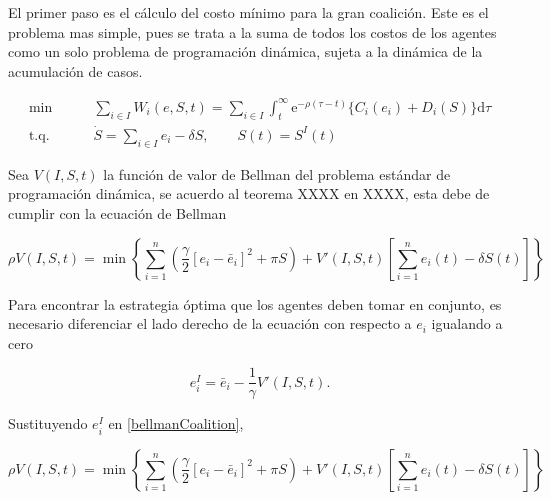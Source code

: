 \documentclass[11pt, oneside]{article}
\newcommand{\eu}{\ensuremath{\mathrm{e}}}
\newcommand{\du}{\ensuremath{\mathrm{d}}}
\begin{document}
El primer paso es el cálculo del costo mínimo para la gran coalición. Este es el problema mas simple, pues se trata a la suma de todos los costos de los agentes como un solo problema de programación dinámica, sujeta a la dinámica de la acumulación de casos.

\begin{align}
	\min &\qquad \sum_{i\in I} W_i(e,S,t) = \sum_{i\in I} \int_t^\infty \eu^{-\rho(\tau - t)}
	\{
		C_i(e_i) + D_i(S)
	\} \du \tau \\
	\mbox{t.q. } &\qquad \dot{S}  = \sum_{i \in I} e_i - \delta S, \qquad S(t) = S^I(t)
\end{align}

Sea $V(I,S, t)$ la función de valor de Bellman del problema estándar de programación dinámica, se acuerdo al teorema XXXX en XXXX, esta debe de cumplir con la ecuación de Bellman

\begin{equation}\label{bellmanCoalition}
	\rho V(I,S,t) = \min \left\{
		\sum_{i=1}^n \left(
		\frac{\gamma}{2}[e_i - \bar{e}_i]^2 + \pi S
		\right) + V'(I,S,t) \left[
			\sum_{i=1}^n e_i(t) - \delta S(t)
		\right]
	\right\}
\end{equation}

Para encontrar la estrategia óptima que los agentes deben tomar en conjunto, es necesario diferenciar el lado derecho de la ecuación con respecto a $e_i$ igualando a cero

\begin{equation}
	e_i^I = \bar{e}_i - \frac{1}{\gamma} V'(I,S,t).
\end{equation}

Sustituyendo $e_i^I$ en \eqref{bellmanCoalition},

\begin{equation}\label{bellmanCoalition}
	\rho V(I,S,t) = \min \left\{
		\sum_{i=1}^n \left(
		\frac{\gamma}{2}[e_i - \bar{e}_i]^2 + \pi S
		\right) + V'(I,S,t) \left[
			\sum_{i=1}^n e_i(t) - \delta S(t)
		\right]
	\right\}
\end{equation}




\end{document}
